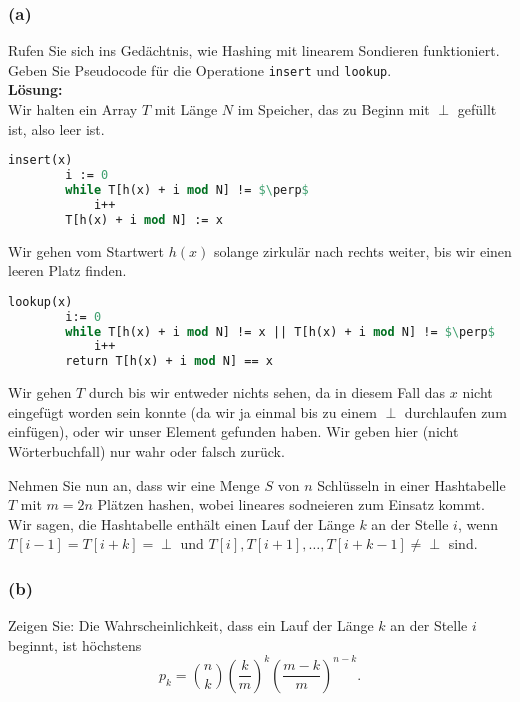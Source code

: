 \documentclass[11pt,a4paper,ngerman]{article}
\begin{document}
{
\subsubsection*{(a)}
Rufen Sie sich ins Gedächtnis, wie Hashing mit linearem Sondieren funktioniert. Geben Sie Pseudocode für die Operatione \lstinline|insert| und \lstinline|lookup|.\\

\noindent\textbf{Lösung:}\\

Wir halten ein Array $T$  mit Länge $N$ im Speicher, das zu Beginn mit $\perp$ gefüllt ist, also leer ist.

\begin{lstlisting}[language=Pascal, frame=single, caption={Insert lineares sondieren}]
	insert(x)
		i := 0
		while T[h(x) + i mod N] != $\perp$
			i++
		T[h(x) + i mod N] := x
\end{lstlisting}

Wir gehen vom Startwert $h(x)$ solange zirkulär nach rechts weiter, bis wir einen leeren Platz finden. 

\begin{lstlisting}[language=Pascal, frame=single, caption={Lookup lineares sondieren}]
	lookup(x)
		i:= 0
		while T[h(x) + i mod N] != x || T[h(x) + i mod N] != $\perp$
			i++
		return T[h(x) + i mod N] == x
\end{lstlisting}

Wir gehen $T$ durch bis wir entweder nichts sehen, da in diesem Fall das $x$ nicht eingefügt worden sein konnte (da wir ja einmal bis zu einem $\perp$ durchlaufen zum einfügen), oder wir unser Element gefunden haben. Wir geben hier (nicht Wörterbuchfall) nur wahr oder falsch zurück.

}
\vspace{10\lineskip}
Nehmen Sie nun an, dass wir eine Menge $S$ von $n$ Schlüsseln in einer Hashtabelle $T$ mit $m = 2n$ Plätzen hashen, wobei lineares sodneieren zum Einsatz kommt. Wir sagen, die Hashtabelle enthält einen Lauf der Länge $k$ an der Stelle $i$, wenn
$T[i-1] = T[i+k]=\perp$ und $T[i], T[i+1], \ldots, T[i+k-1] \not= \perp$ sind.

\subsubsection*{(b)}
Zeigen Sie: Die Wahrscheinlichkeit, dass ein Lauf der Länge $k$ an der Stelle $i$ beginnt, ist höchstens
$$
	p_k = \binom{n}{k}\left(\frac{k}{m}\right)^k \left( \frac{m-k}{m}\right)^{n-k}.
$$
\end{document}

